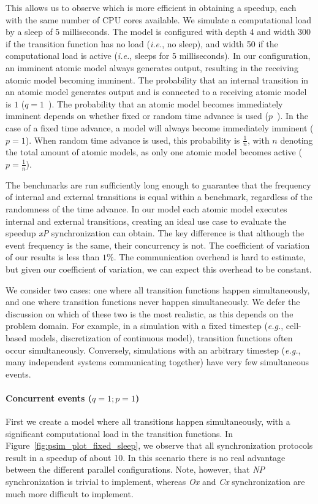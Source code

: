 This allows us to observe which is more efficient in obtaining a speedup, each with the same number of CPU cores available.
We simulate a computational load by a sleep of 5 milliseconds.
The model is configured with depth 4 and width 300 if the transition function has no load (\textit{i.e.}, no sleep), and width 50 if the computational load is active (\textit{i.e.}, sleeps for 5 milliseconds).
In our configuration, an imminent atomic model always generates output, resulting in the receiving atomic model becoming imminent.
The probability that an internal transition in an atomic model generates output and is connected to a receiving atomic model is $1$ ($q = 1$~\cite{amdahlpdevs}).
The probability that an atomic model becomes immediately imminent depends on whether fixed or random time advance is used ($p$~\cite{amdahlpdevs}).
In the case of a fixed time advance, a model will always become immediately imminent ($p = 1$).
When random time advance is used, this probability is $\frac{1}{n}$, with $n$ denoting the total amount of atomic models, as only one atomic model becomes active ($p = \frac{1}{n}$).

The benchmarks are run sufficiently long enough to guarantee that the frequency of internal and external transitions is equal within a benchmark, regardless of the randomness of the time advance.
In our model each atomic model executes internal and external transitions, creating an ideal use case to evaluate the speedup \textit{xP} synchronization can obtain. 
The key difference is that although the event frequency is the same, their concurrency is not. 
The coefficient of variation of our results is less than $1\%$.
The communication overhead is hard to estimate, but given our coefficient of variation, we can expect this overhead to be constant.

We consider two cases: one where all transition functions happen simultaneously, and one where transition functions never happen simultaneously.
We defer the discussion on which of these two is the most realistic, as this depends on the problem domain.
For example, in a simulation with a fixed timestep (\textit{e.g.}, cell-based models, discretization of continuous model), transition functions often occur simultaneously.
Conversely, simulations with an arbitrary timestep (\textit{e.g.}, many independent systems communicating together) have very few simultaneous events.

\paragraph{Concurrent events ($q = 1; p = 1$)}
First we create a model where all transitions happen simultaneously, with a significant computational load in the transition functions.
In Figure~\ref{fig:psim_plot_fixed_sleep}, we observe that all synchronization protocols result in a speedup of about 10.  
In this scenario there is no real advantage between the different parallel configurations.
Note, however, that \textit{NP} synchronization is trivial to implement, whereas \textit{Ox} and \textit{Cx} synchronization are much more difficult to implement.

